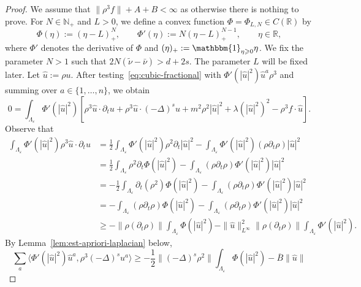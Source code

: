 \documentclass{article}
\numberwithin{equation}{section}
\newcommand{\assign}{:=}
\theoremstyle{plain}
\theoremstyle{definition}
\begin{document}
\begin{proof}
  We assume that $\| \rho^3 f \| + A + B < \infty$ as otherwise there is
  nothing to prove. For $N \in \mathbb{N}_+$ and $L > 0$, we define a convex
  function $\Phi = \Phi_{L, N} \in C (\mathbb{R})$ by
  \[ \Phi (\eta) \assign (\eta - L)^N_+, \qquad \Phi' (\eta)
     \assign N (\eta - L)^{N - 1}_+, \qquad \eta \in \mathbb{R}, \]
  where $\Phi'$ denotes the derivative of $\Phi$ and $(\eta)_+ \assign
  \mathbbm{1}_{\eta \geqslant 0} \eta$. We fix the parameter $N > 1$ such that
  $2 N (\tilde{\nu} - \bar{\nu}) > d + 2 s$. The parameter $L$ will be fixed
  later. Let $\hat{u} \assign \rho u$. After
  testing~\eqref{eq:cubic-fractional} with $\Phi' (| \hat{u} |^2) \hat{u}^a
  \rho^3$ and summing over $a \in \{ 1, \ldots, n \}$, we obtain
  \[ 0 = \int_{{\Lambda_{\varepsilon}} } \Phi' (| \hat{u} |^2)  [\rho^3 
     \hat{u} \cdot \partial_t u + \rho^3  \hat{u} \cdot (- \Delta)^s u + m^2
     \rho^2  | \hat{u} |^2 + \lambda (| \hat{u} |^2)^2 - \rho^3 f \cdot
     \hat{u}] . \]
  Observe that
  \begin{align*}
  	\int_{\Lambda_{\varepsilon}}
  	\Phi'(|\hat u|^2)\rho^3 \hat u\cdot \partial_t u
  	&=
  	\frac12
  	\int_{\Lambda_{\varepsilon}}
  	\Phi'(|\hat u|^2)\rho^2 \partial_t |\hat u|^2
  	-
  	\int_{\Lambda_{\varepsilon}}
  	\Phi'(|\hat u|^2)(\rho\partial_t\rho)|\hat u|^2
  	\\
  	&=
  	\frac12
  	\int_{\Lambda_{\varepsilon}}
  	\rho^2 \partial_t\Phi(|\hat u|^2)
  	-
  	\int_{\Lambda_{\varepsilon}}
  	(\rho\partial_t\rho)\Phi'(|\hat u|^2)|\hat u|^2
  	\\
  	&=
  	-\frac12
  	\int_{\Lambda_{\varepsilon}}
  	\partial_t(\rho^2)\Phi(|\hat u|^2)
  	-
  	\int_{\Lambda_{\varepsilon}}
  	(\rho\partial_t\rho)\Phi'(|\hat u|^2)|\hat u|^2
  	\\
  	&=
  	-
  	\int_{\Lambda_{\varepsilon}}
  	(\rho\partial_t\rho)\Phi(|\hat u|^2)
  	-
  	\int_{\Lambda_{\varepsilon}}
  	(\rho\partial_t\rho)\Phi'(|\hat u|^2)|\hat u|^2
  	\\
  	&\geqslant
  	-\|\rho(\partial_t\rho)\|
  	\int_{\Lambda_{\varepsilon}}\Phi(|\hat u|^2)
  	-
  	\|\hat u\|_{L^\infty}^2
  	\|\rho(\partial_t\rho)\|
  	\int_{\Lambda_{\varepsilon}}\Phi'(|\hat u|^2).
  \end{align*}
  By Lemma~\ref{lem:est-apriori-laplacian} below,
  \[ \sum_a \langle \Phi' (| \hat{u} |^2)  \hat{u}^a, \rho^3  (- \Delta)^s u^a
     \rangle \geqslant - \frac{1}{2} \| (- \Delta)^s \rho^2 \|
     \int_{\Lambda_{\varepsilon}} \Phi (| \hat{u} |^2) -
     \overline{B}  \| \hat{u} \| 
\]
\end{proof}
\end{document}
